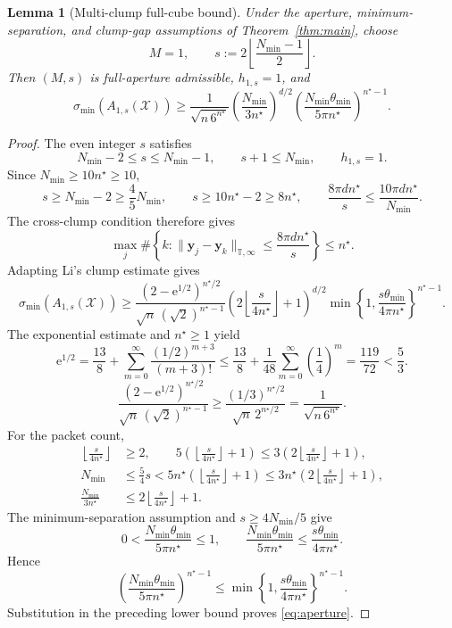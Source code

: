 \documentclass[11pt]{article}
\newtheorem{lemma}{Lemma}
\newcommand{\X}{\mathcal X}
\newcommand{\T}{\mathbb T}
\begin{document}
\begin{lemma}[Multi-clump full-cube bound]\label{lem:aperture}
Under the aperture, minimum-separation, and clump-gap assumptions of Theorem~\ref{thm:main}, choose
\[
M=1,\qquad s:=2\left\lfloor\frac{N_{\min}-1}{2}\right\rfloor.
\]
Then $(M,s)$ is full-aperture admissible, $h_{1,s}=1$, and
\begin{equation}\label{eq:aperture}
\sigma_{\min}(A_{1,s}(\X))\ge\frac{1}{\sqrt{n\,6^{n^\star}}}\left(\frac{N_{\min}}{3n^\star}\right)^{d/2}\left(\frac{N_{\min}\theta_{\min}}{5\pi n^\star}\right)^{n^\star-1}.
\end{equation}
\end{lemma}
\begin{proof}
The even integer $s$ satisfies
\[
N_{\min}-2\le s\le N_{\min}-1,\qquad s+1\le N_{\min},\qquad h_{1,s}=1.
\]
Since $N_{\min}\ge10n^\star\ge10$,
\[
s\ge N_{\min}-2\ge\frac45N_{\min},\qquad s\ge10n^\star-2\ge8n^\star,\qquad \frac{8\pi dn^\star}{s}\le\frac{10\pi dn^\star}{N_{\min}}.
\]
The cross-clump condition therefore gives
\[
\max_j\#\left\{k:\|\bm y_j-\bm y_k\|_{\T,\infty}\le\frac{8\pi dn^\star}{s}\right\}\le n^\star.
\]
Adapting Li's clump estimate \cite[Theorem~3.10]{Li} gives
\[
\sigma_{\min}(A_{1,s}(\X))\ge\frac{(2-\mathrm e^{1/2})^{n^\star/2}}{\sqrt n\,(\sqrt2)^{n^\star-1}}\left(2\left\lfloor\frac{s}{4n^\star}\right\rfloor+1\right)^{d/2}\min\left\{1,\frac{s\theta_{\min}}{4\pi n^\star}\right\}^{n^\star-1}.
\]
The exponential estimate and $n^\star\ge1$ yield
\[
\mathrm e^{1/2}=\frac{13}{8}+\sum_{m=0}^{\infty}\frac{(1/2)^{m+3}}{(m+3)!}\le\frac{13}{8}+\frac1{48}\sum_{m=0}^{\infty}\left(\frac14\right)^m=\frac{119}{72}<\frac53.
\]
\[
\frac{(2-\mathrm e^{1/2})^{n^\star/2}}{\sqrt n\,(\sqrt2)^{n^\star-1}}\ge\frac{(1/3)^{n^\star/2}}{\sqrt n\,2^{n^\star/2}}=\frac1{\sqrt{n\,6^{n^\star}}}.
\]
For the packet count,
\begin{align*}
\left\lfloor\frac{s}{4n^\star}\right\rfloor&\ge2,\qquad 5\left(\left\lfloor\frac{s}{4n^\star}\right\rfloor+1\right)\le3\left(2\left\lfloor\frac{s}{4n^\star}\right\rfloor+1\right),\\
N_{\min}&\le\frac54s<5n^\star\left(\left\lfloor\frac{s}{4n^\star}\right\rfloor+1\right)\le3n^\star\left(2\left\lfloor\frac{s}{4n^\star}\right\rfloor+1\right),\\
\frac{N_{\min}}{3n^\star}&\le2\left\lfloor\frac{s}{4n^\star}\right\rfloor+1.
\end{align*}
The minimum-separation assumption and $s\ge4N_{\min}/5$ give
\[
0<\frac{N_{\min}\theta_{\min}}{5\pi n^\star}\le1,\qquad \frac{N_{\min}\theta_{\min}}{5\pi n^\star}\le\frac{s\theta_{\min}}{4\pi n^\star}.
\]
Hence
\[
\left(\frac{N_{\min}\theta_{\min}}{5\pi n^\star}\right)^{n^\star-1}\le\min\left\{1,\frac{s\theta_{\min}}{4\pi n^\star}\right\}^{n^\star-1}.
\]
Substitution in the preceding lower bound proves \eqref{eq:aperture}.
\end{proof}
\end{document}
